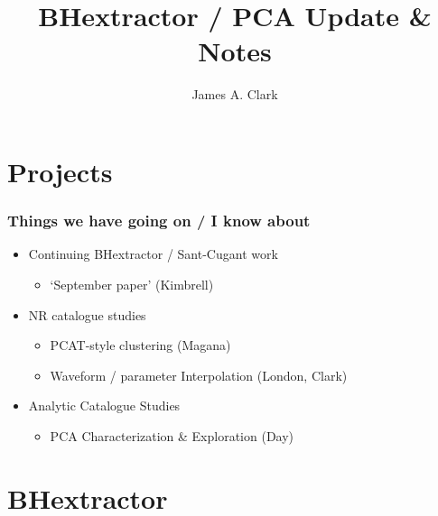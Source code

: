 \documentclass{beamer}
\begin{document}
\title{BHextractor / PCA Update \& Notes}
\author{James A. Clark}
\date{} 

\begin{frame}[plain]
\titlepage
\end{frame}


\section{Projects}

\begin{frame}

    \frametitle{Things we have going on / I know about}
    \begin{itemize}
        \item Continuing BHextractor / Sant-Cugant work
            \begin{itemize} 
                \item `September paper' (Kimbrell)
            \end{itemize}
        \item NR catalogue studies
            \begin{itemize} 
                \item PCAT-style clustering (Magana) 
                \item Waveform / parameter Interpolation (London, Clark)
            \end{itemize}
        \item Analytic Catalogue Studies
            \begin{itemize}
                \item PCA Characterization \& Exploration (Day)
            \end{itemize}
    \end{itemize}

\end{frame}

\section{BHextractor}
\end{document}
